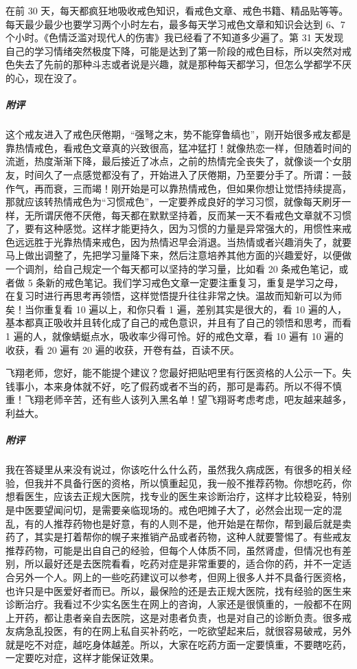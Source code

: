 \begin{case}
    在前 30 天，每天都疯狂地吸收戒色知识，看戒色文章、戒色书籍、精品贴等等。每天最少最少也要学习两个小时左右，最多每天学习戒色文章和知识会达到 6、7 个小时。《色情泛滥对现代人的伤害》我已经看了不知道多少遍了。第 31 天发现自己的学习情绪突然极度下降，可能是达到了第一阶段的戒色目标，所以突然对戒色失去了先前的那种斗志或者说是兴趣，就是那种每天都学习，但怎么学都学不厌的心，现在没了。
    \subparagraph{附评} 这个戒友进入了戒色厌倦期，“强弩之末，势不能穿鲁缟也”，刚开始很多戒友都是靠热情戒色，看戒色文章真的兴致很高，猛冲猛打！就像热恋一样，但随着时间的流逝，热度渐渐下降，最后接近了冰点，之前的热情完全丧失了，就像谈一个女朋友，时间久了一点感觉都没有了，开始进入了厌倦期，乃至要分手了。所谓：一鼓作气，再而衰，三而竭！刚开始是可以靠热情戒色，但如果你想让觉悟持续提高，那就应该转热情戒色为“习惯戒色”，一定要养成良好的学习习惯，就像每天刷牙一样，无所谓厌倦不厌倦，每天都在默默坚持着，反而某一天不看戒色文章就不习惯了，要有这种感觉。这样才能更持久，因为习惯的力量是异常强大的，用惯性来戒色远远胜于光靠热情来戒色，因为热情迟早会消退。当热情或者兴趣消失了，就要马上做出调整了，先把学习量降下来，然后注意培养其他方面的兴趣爱好，以便做一个调剂，给自己规定一个每天都可以坚持的学习量，比如看 20 条戒色笔记，或者做 5 条新的戒色笔记。我们学习戒色文章一定要注重复习，重复是学习之母，在复习时进行再思考再领悟，这样觉悟提升往往非常之快。温故而知新可以为师矣！当你重复看 10 遍以上，和你只看 1 遍，差别其实是很大的，看 10 遍的人，基本都真正吸收并且转化成了自己的戒色意识，并且有了自己的领悟和思考，而看 1 遍的人，就像蜻蜓点水，吸收率少得可怜。好的戒色文章，看 10 遍有 10 遍的收获，看 20 遍有 20 遍的收获，开卷有益，百读不厌。
\end{case}

\begin{case}
    飞翔老师，您好，能不能提个建议？您最好把贴吧里有行医资格的人公示一下。失钱事小，本来身体就不好，吃了假药或者不当的药，那可是毒药。所以不得不慎重！飞翔老师辛苦，还有些人该列入黑名单！望飞翔哥考虑考虑，吧友越来越多，利益大。
    \subparagraph{附评} 我在答疑里从来没有说过，你该吃什么什么药，虽然我久病成医，有很多的相关经验，但我并不具备行医的资格，所以慎重起见，我一般不推荐药物。你想吃药，你想看医生，应该去正规大医院，找专业的医生来诊断治疗，这样才比较稳妥，特别是中医要望闻问切，是需要亲临现场的。戒色吧摊子大了，必然会出现一定的混乱，有的人推荐药物也是好意，有的人则不是，他开始是在帮你，帮到最后就是卖药了，其实是打着帮你的幌子来推销产品或者药物，这种人就要警惕了。有些戒友推荐药物，可能是出自自己的经验，但每个人体质不同，虽然肾虚，但情况也有差别，所以最好还是去医院看看，吃药对症是非常重要的，适合你的药，并不一定适合另外一个人。网上的一些吃药建议可以参考，但网上很多人并不具备行医资格，也许只是中医爱好者而已。所以，最保险的还是去正规大医院，找有经验的医生来诊断治疗。我看过不少实名医生在网上的咨询，人家还是很慎重的，一般都不在网上开药，都让患者亲自去医院，这是对患者负责，也是对自己的诊断负责。很多戒友病急乱投医，有的在网上私自买补药吃，一吃欲望起来后，就很容易破戒，另外就是吃不对症，越吃身体越差。所以，大家在吃药方面一定要慎重，不要瞎吃药，一定要吃对症，这样才能保证效果。
\end{case}

